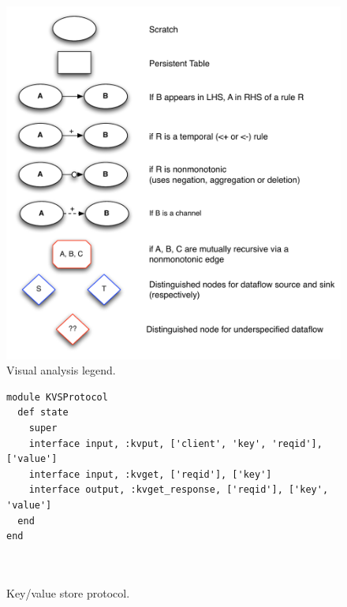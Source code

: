 \begin{figure}[t]
\centering
\includegraphics[width=1.1\linewidth]{fig/mittalk_legend.pdf}
\vspace{-10pt}
\caption{Visual analysis legend.}
\label{fig:analysis-legend}
\vspace{-2pt}
\end{figure}






\begin{figure}[t]
\begin{scriptsize}
\begin{lstlisting}
module KVSProtocol
  def state
    super
    interface input, :kvput, ['client', 'key', 'reqid'], ['value']
    interface input, :kvget, ['reqid'], ['key']
    interface output, :kvget_response, ['reqid'], ['key', 'value']
  end
end



\end{lstlisting}
\vspace{-10pt}
\caption{Key/value store protocol.}
\label{fig:kvs-proto}
\end{scriptsize}
\vspace{-2pt}
\end{figure}

